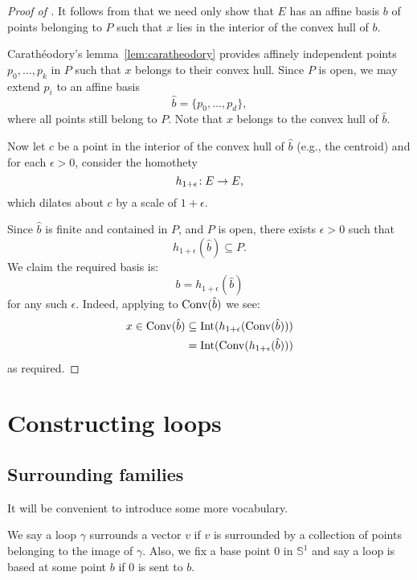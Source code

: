 \begin{proof}[Proof of ]
  \leanok
  It follows from  that we need only show that $E$
  has an affine basis $b$ of points belonging to $P$ such that $x$ lies in
  the interior of the convex hull of $b$.

  Carathéodory's lemma~\ref{lem:caratheodory} provides affinely independent
  points $p_0, \dots, p_k$ in $P$ such that $x$ belongs to their convex
  hull. Since $P$ is open, we may extend $p_i$ to an affine basis
  \[
    \hat b = \{p_0, \ldots, p_d\},
  \]
  where all points still belong to $P$.
  Note that $x$ belongs to the convex hull of $\hat b$.

  Now let $c$ be a point in the interior of the convex hull of $\hat b$
  (e.g., the centroid) and for each $\epsilon > 0$, consider the homothety
  \[
    h_{1+\epsilon} \!: E \to E,
  \]
  which dilates about $c$ by a scale of $1 + \epsilon$.

  Since $\hat b$ is finite and contained in $P$, and $P$ is open, there exists
  $\epsilon > 0$ such that
  \[
    h_{1+\epsilon} (\hat b) \subseteq P.
  \]
  We claim the required basis is:
  \[
    b = h_{1+\epsilon} (\hat b)
  \]
  for any such $\epsilon$. Indeed, applying
   to $\operatorname{Conv}(\hat b)$ we see:
  \begin{align*}
    x \in \operatorname{Conv}(\hat b) &\subseteq \operatorname{Int} (h_{1+\epsilon} (\operatorname{Conv}(\hat b)))\\
                  &= \operatorname{Int} (\operatorname{Conv}(h_{1+\epsilon} (\hat b)))
  \end{align*}
  as required.
\end{proof}


\section{Constructing loops}

\subsection{Surrounding families}
\label{sub:surrounding_families}

It will be convenient to introduce some more vocabulary.

\begin{definition}
  \label{def:surrounds}
  \leanok
  We say a loop $γ$ surrounds a vector $v$ if $v$ is surrounded
  by a collection of points belonging to the image of $γ$.
  Also, we fix a base point $0$ in $𝕊^1$ and say a loop is based at some
  point $b$ if $0$ is sent to $b$.
\end{definition}

